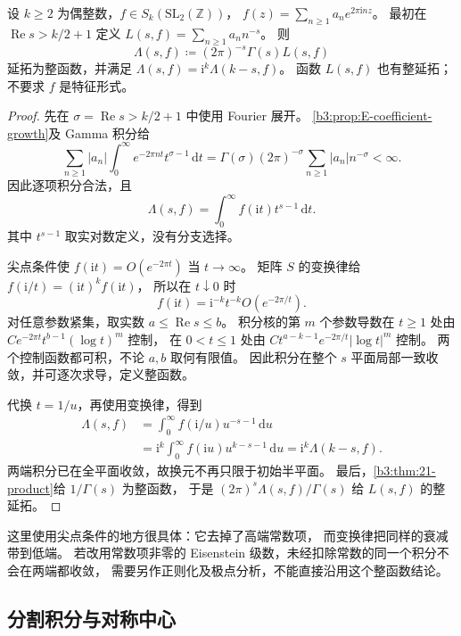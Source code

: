 \begin{theorem}[完成函数的方程]\label{b3:thm:E-functional-equation}
设 \(k\ge2\) 为偶整数，\(f\in S_k(\mathrm{SL}_2(\mathbb Z))\)，
\(f(z)=\sum_{n\ge1}a_ne^{2\pi\mathrm i nz}\)。
最初在 \(\operatorname{Re}s>k/2+1\) 定义 \(L(s,f)=\sum_{n\ge1}a_nn^{-s}\)。
则
\[
 \Lambda(s,f)\coloneqq(2\pi)^{-s}\Gamma(s)L(s,f)
\]
延拓为整函数，并满足
\(\Lambda(s,f)=\mathrm i^k\Lambda(k-s,f)\)。
函数 \(L(s,f)\) 也有整延拓；不要求 \(f\) 是特征形式。
\end{theorem}
\begin{proof}
先在 \(\sigma=\operatorname{Re}s>k/2+1\) 中使用 Fourier 展开。
\cref{b3:prop:E-coefficient-growth}及 Gamma 积分给
\[
 \sum_{n\ge1}|a_n|\int_0^\infty e^{-2\pi nt}t^{\sigma-1}\,\mathrm dt
 =\Gamma(\sigma)(2\pi)^{-\sigma}
                    \sum_{n\ge1}|a_n|n^{-\sigma}<\infty.
\]
因此逐项积分合法，且
\[
 \Lambda(s,f)=\int_0^\infty f(\mathrm i t)t^{s-1}\,\mathrm dt.
\]
其中 \(t^{s-1}\) 取实对数定义，没有分支选择。

尖点条件使 \(f(\mathrm i t)=O(e^{-2\pi t})\) 当 \(t\to\infty\)。
矩阵 \(S\) 的变换律给
\(f(\mathrm i/t)=(\mathrm i t)^kf(\mathrm i t)\)，
所以在 \(t\downarrow0\) 时
\[
 f(\mathrm i t)=\mathrm i^{-k}t^{-k}O(e^{-2\pi/t}).
\]
对任意参数紧集，取实数 \(a\le\operatorname{Re}s\le b\)。
积分核的第 \(m\) 个参数导数在 \(t\ge1\) 处由
\(C e^{-2\pi t}t^{b-1}(\log t)^m\) 控制，
在 \(0<t\le1\) 处由
\(C t^{a-k-1}e^{-2\pi/t}|\log t|^m\) 控制。
两个控制函数都可积，不论 \(a,b\) 取何有限值。
因此积分在整个 \(s\) 平面局部一致收敛，并可逐次求导，定义整函数。

代换 \(t=1/u\)，再使用变换律，得到
\[
 \begin{aligned}
 \Lambda(s,f)
 &=\int_0^\infty f(\mathrm i/u)u^{-s-1}\,\mathrm du\\
 &=\mathrm i^k\int_0^\infty f(\mathrm i u)u^{k-s-1}\,\mathrm du
 =\mathrm i^k\Lambda(k-s,f).
 \end{aligned}
\]
两端积分已在全平面收敛，故换元不再只限于初始半平面。
最后，\cref{b3:thm:21-product}给 \(1/\Gamma(s)\) 为整函数，
于是 \((2\pi)^s\Lambda(s,f)/\Gamma(s)\) 给 \(L(s,f)\) 的整延拓。
\end{proof}
这里使用尖点条件的地方很具体：它去掉了高端常数项，
而变换律把同样的衰减带到低端。
若改用常数项非零的 Eisenstein 级数，未经扣除常数的同一个积分不会在两端都收敛，
需要另作正则化及极点分析，不能直接沿用这个整函数结论。

\subsection{分割积分与对称中心}
\label{b3:subsec:E0402}

